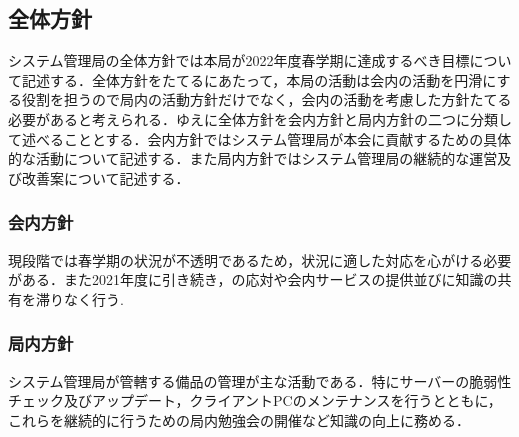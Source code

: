 \subsection*{全体方針}

システム管理局の全体方針では本局が2022年度春学期に達成するべき目標について記述する．全体方針をたてるにあたって，本局の活動は会内の活動を円滑にする役割を担うので局内の活動方針だけでなく，会内の活動を考慮した方針たてる必要があると考えられる．ゆえに全体方針を会内方針と局内方針の二つに分類して述べることとする．会内方針ではシステム管理局が本会に貢献するための具体的な活動について記述する．また局内方針ではシステム管理局の継続的な運営及び改善案について記述する．

\subsubsection*{会内方針}
現段階では春学期の状況が不透明であるため，状況に適した対応を心がける必要がある．また2021年度に引き続き，\firstGrade{}の応対や会内サービスの提供並びに知識の共有を滞りなく行う.

\subsubsection*{局内方針}
システム管理局が管轄する備品の管理が主な活動である．特にサーバーの脆弱性チェック及びアップデート，クライアントPCのメンテナンスを行うとともに，これらを継続的に行うための局内勉強会の開催など知識の向上に務める．
